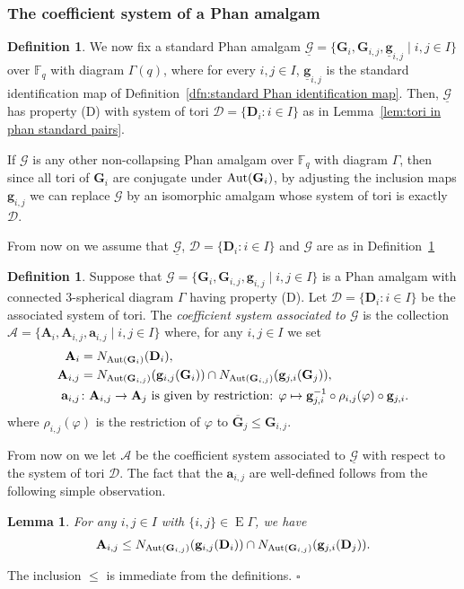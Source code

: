 \documentclass[12pt]{amsart}
\newtheorem{lemma}[theorem]{Lemma}
\theoremstyle{definition}
\newtheorem{definition}[theorem]{Definition}
\newcommand{\bpf}{\noindent{\bf Proof}\hspace{7pt}}
\newcommand{\epf}{\qed}
\newcommand{\ble}{\begin{lemma}}
\newcommand{\ele}{\end{lemma}}
\newcommand{\bde}{\begin{definition}}
\newcommand{\ede}{\end{definition}}
\newcommand{\ul}{\underline}
\newcommand{\cD}{{\mathcal D}}
\newcommand{\Aut}{\mathop{\rm Aut}\nolimits}
\renewcommand{\bar}{\overline}
\def\cD{{\mathcal D}}
\newcommand{\FF}{{\mathbb F}}
\newcommand{\dfn}{\em}
\newcommand{\after}{\mathbin{ \circ }}
\renewcommand{\qed}{\hfill $\square$}
\newcommand{\amgrpA}{{\mathbf{A}}}
\newcommand{\amgrpD}{{\mathbf{D}}}
\newcommand{\amgrpG}{{\mathbf{G}}}
\newcommand{\ama}{{\mathbf a}}
\newcommand{\amg}{{\mathbf g}}
\newcommand{\famg}{\ul{\mathbf g}}
\newcommand{\bamgrpG}{\bar{\amgrpG}}
\newcommand{\amA}{{\mathscr{A}}}
\newcommand{\famG}{\ul{\mathscr{G}}}
\newcommand{\amG}{{\mathscr{G}}}
\DeclareMathOperator{\edg}{E}
\newcommand{\liediag}{\Gamma}
\begin{document}
\subsubsection{The coefficient system of a  Phan amalgam}\label{subsec:Phan coefficient system}

\bde\label{dfn:type of P amalgam}
We now fix a standard Phan amalgam  $\famG=\{\amgrpG_i,\amgrpG_{i,j},\famg_{i,j}\mid i,j\in I\}$ over $\FF_q$ with diagram $\liediag(q)$, where for every $i,j\in I$, $\famg_{i,j}$ is the standard identification map of Definition~\ref{dfn:standard Phan identification map}.
Then,  $\famG$ has property (D) with system of tori $\cD=\{\amgrpD_i\colon i\in I\}$ as in Lemma~\ref{lem:tori in phan standard pairs}. 

If $\amG$ is any other  non-collapsing Phan amalgam over $\FF_q$ with diagram $\liediag$, then since all tori of $\amgrpG_i$ are conjugate under $\Aut(\amgrpG_i)$, by adjusting the inclusion maps $\amg_{i,j}$ we can replace $\amG$ by an isomorphic amalgam whose system of tori is exactly $\cD$.
\ede


From now on we assume that $\famG$, $\cD=\{\amgrpD_i\colon i\in I\}$ and $\amG$ are as in Definition~\ref{dfn:type of P amalgam}


\bde\label{dfn:phan coefficient system}
Suppose that $\amG=\{\amgrpG_i,\amgrpG_{i,j},\amg_{i,j}\mid i,j\in I\}$ is a Phan amalgam with connected $3$-spherical diagram $\liediag$ having property (D).
Let $\cD=\{\amgrpD_i\colon i\in I\}$  be the associated system of  tori.
The {\dfn coefficient system associated to $\amG$} is the collection 
 $\amA=\{\amgrpA_i,\amgrpA_{i,j},\ama_{i,j}\mid i,j\in I\}$ where, for any $i,j\in I$ we set 
 \begin{align*}
 \amgrpA_i&=N_{\Aut(\amgrpG_i)}(\amgrpD_i), \\
 \amgrpA_{i,j}&=N_{\Aut(\amgrpG_{i,j})}(\amg_{i,j}(\amgrpG_i))\cap N_{\Aut(\amgrpG_{i,j})}(\amg_{j,i}(\amgrpG_j)), \\
 \ama_{i,j}&\colon \amgrpA_{i,j}\to\amgrpA_j \mbox{ is given by restriction: } \varphi\mapsto \amg_{j,i}^{-1}\after \rho_{i,j}(\varphi)\after\amg_{j,i}.
  \end{align*}
where $\rho_{i,j}(\varphi)$ is the restriction of $\varphi$ to $\bamgrpG_j\le \amgrpG_{i,j}$.
\ede
From now on we let $\amA$ be the coefficient system associated to $\famG$ with respect to the system of tori $\cD$.
The fact that the $\ama_{i,j}$ are well-defined follows from the following simple observation.
\ble\label{lem:N G1 G2=N D1 D2} 
For any $i,j\in I$ with $\{i,j\}\in \edg\liediag$, we have 
\begin{align*}
\amgrpA_{i,j}\le N_{\Aut(\amgrpG_{i,j})}(\amg_{i,j}(\amgrpD_i))\cap N_{\Aut(\amgrpG_{i,j})}(\amg_{j,i}(\amgrpD_j)).
\end{align*}
\ele
\bpf
The inclusion $\le$ is immediate from the definitions.
\epf
\end{document}
